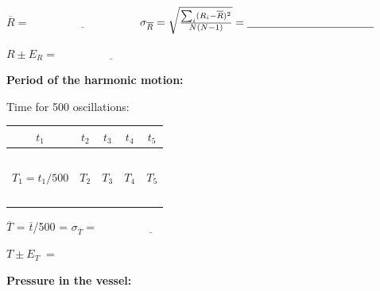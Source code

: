 \documentclass{article}
\begin{document}
\vspace{4mm}

$\overline{R}=\underline{\hspace{4cm}}$
\hspace{1cm}
$\sigma_{\overline{R}}=
\sqrt{\sum_i(R_i-\overline{R})^2\over N(N-1)}=\underline{\hspace{4cm}}$  
\vspace{4mm}

$R\pm E_R = \underline{\hspace{4cm}}$

\vspace{6mm}

\bf{Period of the harmonic motion:}

\vspace{5mm}

Time for 500 oscillations:

\vspace{2mm}

\begin{tabular}{|c|c|c|c|c|}
\hline
$t_1$&$t_2$&$t_3$&$t_4$&$t_5$\\
\hline
~\hspace{3cm}~&~\hspace{3cm}~&~\hspace{3cm}~&\hspace{3cm}~&~\hspace{3cm}~\\
\hline
$T_1=t_1/500$&$T_2$&$T_3$&$T_4$&$T_5$\\
\hline
~\hspace{3cm}~&~\hspace{3cm}~&~\hspace{3cm}~&\hspace{3cm}~&~\hspace{3cm}~\\
\hline
\end{tabular}

\vspace{4mm}

$\overline{T}$ = $\overline{t}$/500 = \underline{\hspace{4cm}}
\hspace{1cm}
$\sigma_{\overline{T}}=\underline{\hspace{4cm}}$
\vspace{5mm}

$T\pm E_T \; = $ \underline{\hspace{4cm}}
\vspace{5mm}


\textbf{Pressure in the vessel:}
\end{document}

